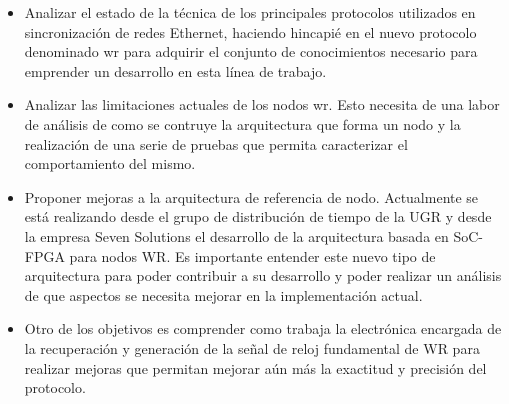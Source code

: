 \begin{itemize}
	\item Analizar el estado de la técnica de los principales protocolos 
	utilizados en sincronización de redes Ethernet, haciendo hincapié en el 
	nuevo protocolo denominado \gls{wr} para adquirir el conjunto de 
	conocimientos necesario para emprender un desarrollo en esta línea de 
	trabajo.
	
	\item Analizar las limitaciones actuales de los nodos \gls{wr}. Esto 
	necesita de una labor de análisis de como se contruye la arquitectura que 
	forma un nodo y la realización de una serie de pruebas que permita 
	caracterizar el comportamiento del mismo.
	
	\item Proponer mejoras a la arquitectura de referencia de nodo. Actualmente 
	se está realizando desde el grupo de distribución de tiempo de la UGR y 
	desde la empresa Seven Solutions el desarrollo de la arquitectura basada en 
	SoC-FPGA para nodos WR. Es importante entender este nuevo tipo de 
	arquitectura para poder contribuir a su desarrollo y poder realizar un 
	análisis de que aspectos se necesita mejorar en la implementación actual.
	
	\item Otro de los objetivos es comprender como trabaja la electrónica 
	encargada de la recuperación y generación de la señal de reloj fundamental 
	de WR para realizar mejoras que permitan mejorar aún más la exactitud y 
	precisión del protocolo.
\end{itemize}




